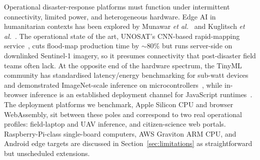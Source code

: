 Operational disaster-response platforms must function under intermittent connectivity, limited power, and heterogeneous hardware. Edge AI in humanitarian contexts has been explored by Munawar \emph{et al.}~\cite{munawar2021review} and Kuglitsch \emph{et al.}~\cite{kuglitsch2022facilitating}. The operational state of the art, UNOSAT's CNN-based rapid-mapping service~\cite{nemni2020rapid}, cuts flood-map production time by $\sim$80\% but runs server-side on downlinked Sentinel-1 imagery, so it presumes connectivity that post-disaster field teams often lack. At the opposite end of the hardware spectrum, the TinyML community has standardised latency/energy benchmarking for sub-watt devices~\cite{banbury2021mlperftiny} and demonstrated ImageNet-scale inference on microcontrollers~\cite{lin2020mcunet}, while in-browser inference is an established deployment channel for JavaScript runtimes~\cite{smilkov2019tfjs}. The deployment platforms we benchmark, Apple Silicon CPU and browser WebAssembly, sit between these poles and correspond to two real operational profiles: field-laptop and UAV inference, and citizen-science web portals. Raspberry-Pi-class single-board computers, AWS Graviton ARM CPU, and Android edge targets are discussed in Section~\ref{sec:limitations} as straightforward but unscheduled extensions.
